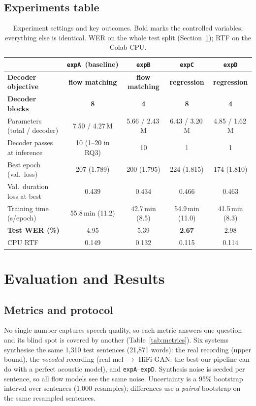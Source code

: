 \documentclass[11pt,a4paper]{article}
\newcommand{\expA}{\texttt{expA}}
\newcommand{\expB}{\texttt{expB}}
\newcommand{\expC}{\texttt{expC}}
\newcommand{\expD}{\texttt{expD}}
\begin{document}
\subsection{Experiments table}
\begin{table}[H]
\centering\small
\caption{Experiment settings and key outcomes. Bold marks the controlled variables; everything else is identical. WER on the whole test split (Section~\ref{sec:results}); RTF on the Colab CPU.}
\label{tab:settings}
\begin{tabular}{@{}lcccc@{}}
\toprule
 & \expA\ (baseline) & \expB & \expC & \expD \\ \midrule
\textbf{Decoder objective} & \textbf{flow matching} & \textbf{flow matching} & \textbf{regression} & \textbf{regression} \\
\textbf{Decoder blocks} & \textbf{8} & \textbf{4} & \textbf{8} & \textbf{4} \\
Parameters (total / decoder) & 7.50 / 4.27\,M & 5.66 / 2.43\,M & 6.43 / 3.20\,M & 4.85 / 1.62\,M \\
Decoder passes at inference & 10 (1--20 in RQ3) & 10 & 1 & 1 \\ \midrule
Best epoch (val.\ loss) & 207 (1.789) & 200 (1.795) & 224 (1.815) & 174 (1.810) \\
Val.\ duration loss at best & 0.439 & 0.434 & 0.466 & 0.463 \\
Training time (s/epoch) & 55.8\,min (11.2) & 42.7\,min (8.5) & 54.9\,min (11.0) & 41.5\,min (8.3) \\
\textbf{Test WER (\%)} & 4.95 & 5.39 & \textbf{2.67} & 2.98 \\
CPU RTF & 0.149 & 0.132 & 0.115 & 0.114 \\ \bottomrule
\end{tabular}
\end{table}

\section{Evaluation and Results}\label{sec:results}
\subsection{Metrics and protocol}\label{sec:metrics}
No single number captures speech quality, so each metric answers one question and its blind spot is covered by another (Table~\ref{tab:metrics}). Six systems synthesise the same 1{,}310 test sentences (21{,}871 words): the real recording (upper bound), the \emph{vocoded} recording (real mel $\rightarrow$ HiFi-GAN: the best our pipeline can do with a perfect acoustic model), and \expA--\expD. Synthesis noise is seeded per sentence, so all flow models see the same noise. Uncertainty is a 95\% bootstrap interval over sentences (1{,}000 resamples); differences use a \emph{paired} bootstrap on the same resampled sentences.
\end{document}
